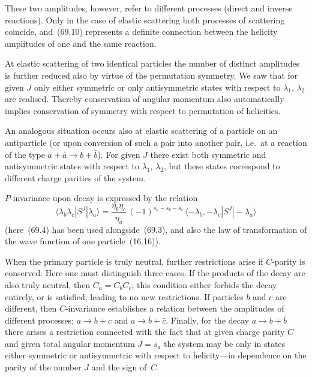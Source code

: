 These two amplitudes, however, refer to different processes (direct and inverse reactions). Only in the case of elastic scattering both processes of scattering coincide, and~(69.10) represents a definite connection between the helicity amplitudes of one and the same reaction.

At elastic scattering of two identical particles the number of distinct amplitudes is further reduced also by virtue of the permutation symmetry. We saw that for given $J$ only either symmetric or only antisymmetric states with respect to $\lambda_1$, $\lambda_2$ are realised. Thereby conservation of angular momentum also automatically implies conservation of symmetry with respect to permutation of helicities.

An analogous situation occurs also at elastic scattering of a particle on an antiparticle (or upon conversion of such a pair into another pair, i.e.\ at a reaction of the type $a + \bar{a} \to b + \bar{b}$). For given $J$ there exist both symmetric and antisymmetric states with respect to $\lambda_1$, $\lambda_2$, but these states correspond to different charge parities of the system.

$P$-invariance upon decay is expressed by the relation
\begin{equation}
\langle\lambda_b\lambda_c|S^J|\lambda_a\rangle = \frac{\eta_b\eta_c}{\eta_a}\,(-1)^{s_a - s_b - s_c}\,\langle -\lambda_b, -\lambda_c|S^J| -\lambda_a\rangle
\tag{69.13}
\end{equation}
(here~(69.4) has been used alongside~(69.3), and also the law of transformation of the wave function of one particle~(16.16)).

When the primary particle is truly neutral, further restrictions arise if $C$-parity is conserved. Here one must distinguish three cases. If the products of the decay are also truly neutral, then $C_a = C_b C_c$; this condition either forbids the decay entirely, or is satisfied, leading to no new restrictions. If particles $b$ and $c$ are different, then $C$-invariance establishes a relation between the amplitudes of different processes: $a \to b + c$ and $a \to \bar{b} + \bar{c}$. Finally, for the decay $a \to b + \bar{b}$ there arises a restriction connected with the fact that at given charge parity $C$ and given total angular momentum $J = s_a$ the system may be only in states either symmetric or antisymmetric with respect to helicity---in dependence on the parity of the number $J$ and the sign of~$C$.

